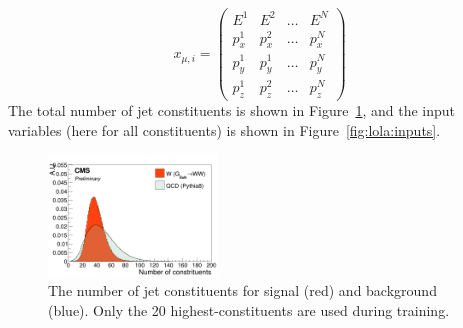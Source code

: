 \begin{equation}
x_{\mu,i}=\begin{pmatrix}
E^1 & E^2 & \dots & E^N \\[1ex]
p_x^1 & p_x^2 & \dots & p_x^N \\[1ex]
p_y^1 & p_y^1 & \dots & p_y^N \\[1ex]
p_z^1 & p_z^2 & \dots & p_z^N
\end{pmatrix}
\end{equation}
The total number of jet constituents is shown in Figure~\ref{fig:lola:nconst}, and the input variables (here for all constituents) is shown in Figure~\ref{fig:lola:inputs}.\newline
\begin{figure}[h!]
\centering
\includegraphics[width=0.4\textwidth]{figures/vtagging/AN-18-099/input/inputs/sig-bkg/nconst.png}
\caption{The number of jet constituents for signal (red) and background (blue). Only the 20 highest-\PT constituents are used during training.}
\label{fig:lola:nconst}
\end{figure}
